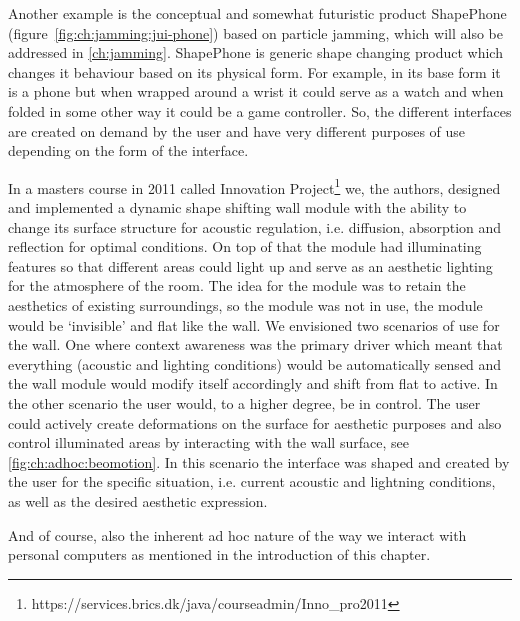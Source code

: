 Another example is the conceptual and somewhat futuristic product ShapePhone (figure~\ref{fig:ch:jamming:jui-phone}) based on particle jamming, which will also be addressed in \autoref{ch:jamming}.
ShapePhone is generic shape changing product which changes it behaviour based on its physical form.
For example, in its base form it is a phone but when wrapped around a wrist it could serve as a watch and when folded in some other way it could be a game controller.
So, the different interfaces are created on demand by the user and have very different purposes of use depending on the form of the interface.

In a masters course in 2011 called Innovation Project\footnote{https://services.brics.dk/java/courseadmin/Inno\_pro2011} \cite{beomotionreportstefan, beomotionreporttore}  we, the authors, designed and implemented a dynamic shape shifting wall module with the ability to change its surface structure for acoustic regulation, i.e. diffusion, absorption and reflection for optimal conditions.
On top of that the module had illuminating features so that different areas could light up and serve as an aesthetic lighting for the atmosphere of the room.
The idea for the module was to retain the aesthetics of existing surroundings, so the module was not in use, the module would be `invisible' and flat like the wall.  
We envisioned two scenarios of use for the wall.
One where context awareness was the primary driver which meant that everything (acoustic and lighting conditions) would be automatically sensed and the wall module would modify itself accordingly and shift from flat to active.
In the other scenario the user would, to a higher degree, be in control.
The user could actively create deformations on the surface for aesthetic purposes and also control illuminated areas by interacting with the wall surface, see \ref{fig:ch:adhoc:beomotion}.
In this scenario the interface was shaped and created by the user for the specific situation, i.e. current acoustic and lightning conditions, as well as the desired aesthetic expression. 

 And of course, also the inherent ad hoc nature of the way we interact with personal computers as mentioned in the introduction of this chapter.
\blank
{} 

